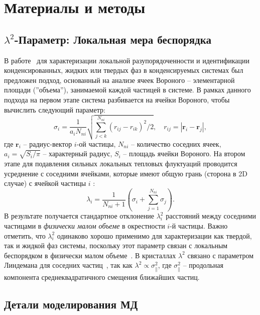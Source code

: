 \section{Материалы и методы}

\subsection{$\lambda^2$-Параметр: Локальная мера беспорядка}
\label{SSMF-AppA}

В работе~\cite{10.1021/acs.jpcc.7b09317} для характеризации локальной разупорядоченности и идентификации конденсированных, жидких или твердых фаз в конденсируемых системах был предложен подход, основанный на анализе ячеек Вороного -- элементарной площади (''объема''), занимаемой каждой частицей в системе.
В рамках данного подхода на первом этапе система разбивается на ячейки Вороного, чтобы вычислить следующий параметр:
\begin{equation}
\label{SSMF-eq1}
\sigma_{i} =\frac{1}{a_i N_{ni}}\sqrt{\sum_{j<k}^{N_{ni}}{(r_{ij}-r_{ik})^2}/2}, \quad r_{ij}=|\mathbf{r}_i-\mathbf{r}_j|,
\end{equation}
где $\mathbf{r}_i$ -- радиус-вектор $i$-ой частицы, $N_{ni}$ -- количество соседних ячеек, $a_i = \sqrt{S_i/\pi}$ -- характерный радиус, $S_i$ -- площадь ячейки Вороного.
На втором этапе для подавления сильных локальных тепловых флуктуаций проводится усреднение с соседними ячейками, которые имеют общую грань (сторона в 2D случае) с ячейкой частицы $i$ \cite{10.1021/acs.jpcc.7b09317}:
\begin{equation}
\label{SSMF-eq2}
\lambda_{i} = \frac{1}{N_{ni}+1}\left(\sigma_{i}+\sum_{j=1}^{N_{ni}}{\sigma_{j}}\right).
\end{equation}
В результате получается стандартное отклонение $\lambda_i^2$ расстояний между соседними частицами в \emph{физически малом объеме} в окрестности $i$-й частицы.
Важно отметить, что $\lambda_i^2$ одинаково хорошо применимо для характеризации как твердой, так и жидкой фаз системы, поскольку этот параметр связан с локальным беспорядком в физически малом объеме~\cite{10.1021/acs.jpcc.7b09317}.
В кристаллах $\lambda^2$ связано с параметром Линдемана для соседних частиц~\cite{10.1016/0375-9601(85)90617-6}, так как $\lambda^2 \propto \sigma_\|^2$, где $\sigma_\|^2$ -- продольная компонента среднеквадратичного смещения ближайших частиц.


\subsection{Детали моделирования МД}
\label{SSMF-AppC}

